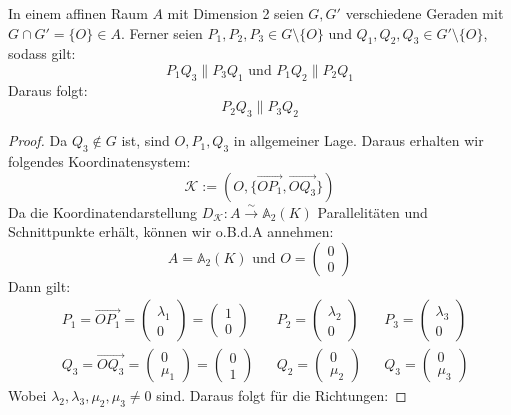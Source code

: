 \documentclass[parskip,a4paper,twoside,DIV15,BCOR12mm]{scrbook}
\begin{document}
\begin{theo}
\label{Satz 21.4}
In einem affinen Raum $A$ mit Dimension 2 seien $G,G'$ verschiedene Geraden
mit $G\cap G'=\{O\}\in A$. Ferner seien $P_1,P_2,P_3\in G\setminus\{O\}$
und $Q_1,Q_2,Q_3\in G'\setminus\{O\}$, sodass gilt:
\[ P_1Q_3\parallel P_3Q_1\text{ und }P_1Q_2\parallel P_2Q_1\]
Daraus folgt:
\[ P_2Q_3\parallel P_3Q_2\]
\end{theo}

\begin{proof}
Da $Q_3\notin G$ ist, sind $O,P_1,Q_3$ in allgemeiner Lage. Daraus erhalten
wir folgendes Koordinatensystem: 
\[\mathcal{K}:=(O,\{\overrightarrow{OP_1},\overrightarrow{OQ_3}\})\]
Da die Koordinatendarstellung $D_{\mathcal{K}}:A\stackrel{\sim}{\to}\mathbb{A}_2(K)$ 
Parallelitäten und Schnittpunkte erhält, können wir o.B.d.A annehmen:
\[A=\mathbb{A}_2(K) \text{ und }O=\begin{pmatrix}0\\0\end{pmatrix}\]
Dann gilt:
\begin{align*}
&P_1=\overrightarrow{OP_1}=\begin{pmatrix}\lambda_1\\0\end{pmatrix}=\begin{pmatrix}1\\0\end{pmatrix}
& &P_2=\begin{pmatrix}\lambda_2\\0\end{pmatrix}
& &P_3=\begin{pmatrix}\lambda_3\\0\end{pmatrix}\\
&Q_3=\overrightarrow{OQ_3}=\begin{pmatrix}0\\\mu_1\end{pmatrix}=\begin{pmatrix}0\\1\end{pmatrix}
& &Q_2=\begin{pmatrix}0\\\mu_2\end{pmatrix}
& &Q_3=\begin{pmatrix}0\\\mu_3\end{pmatrix}
\end{align*}
Wobei $\lambda_2,\lambda_3,\mu_2,\mu_3\ne 0$ sind. Daraus folgt für die Richtungen:

\end{proof}
\end{document}
